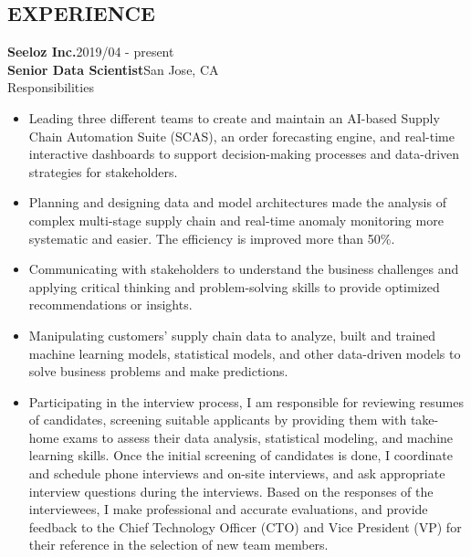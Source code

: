\documentclass[margin, 10pt]{res} %
\begin{document}
\begin{resume}

\section{EXPERIENCE}
\textbf{Seeloz Inc.}\hfill{2019/04 - present}\\
\textbf{Senior Data Scientist}\hfill{San Jose, CA}\\
\textrm{Responsibilities}
\begin{itemize}
    \item Leading three different teams to create and maintain an AI-based Supply Chain Automation Suite (SCAS), an order forecasting engine, and real-time interactive dashboards to support decision-making processes and data-driven strategies for stakeholders.
    \item Planning and designing data and model architectures made the analysis of complex multi-stage supply chain and real-time anomaly monitoring more systematic and easier. The efficiency is improved more than 50\%.
    \item Communicating with stakeholders to understand the business challenges and applying critical thinking and problem-solving skills to provide optimized recommendations or insights.
    \item Manipulating customers' supply chain data to analyze, built and trained machine learning models, statistical models, and other data-driven models to solve business problems and make predictions.
    \item Participating in the interview process, I am responsible for reviewing resumes of candidates, screening suitable applicants by providing them with take-home exams to assess their data analysis, statistical modeling, and machine learning skills. Once the initial screening of candidates is done, I coordinate and schedule phone interviews and on-site interviews, and ask appropriate interview questions during the interviews. Based on the responses of the interviewees, I make professional and accurate evaluations, and provide feedback to the Chief Technology Officer (CTO) and Vice President (VP) for their reference in the selection of new team members.

\end{itemize}
\end{resume}
\end{document}
